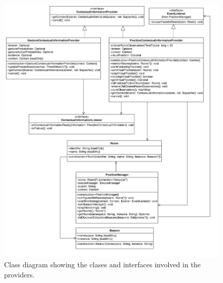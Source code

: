 \begin{figure}[h!]
\centering
\includegraphics[width=\textwidth]{images/uml-context-engine-providers}
\caption{Class diagram showing the clases and interfaces involved in the providers.}
\label{fig:implementation:context-engine:providers}
\end{figure}

